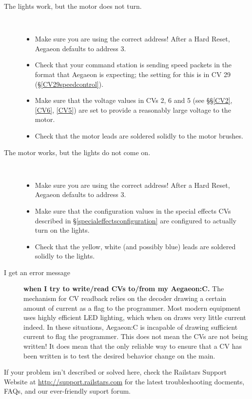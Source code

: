 \documentclass[12pt,letterpaper,draft]{memoir} %
\begin{document}
\begin{description}
\item[The lights work, but the motor does not turn.]\ 
    \begin{itemize}
	\item Make sure you are using the correct address! After a Hard Reset, Aegaeon defaults to address 3.
	\item Check that your command station is sending speed packets in the format that Aegaeon is expecting; the setting for this is in CV 29 (\S\ref{CV29speedcontrol}).
   \item Make sure that the voltage values in CVs 2, 6 and 5 (see \S\S\ref{CV2}, \ref{CV6}, \ref{CV5}) are set to provide a reasonably large voltage to the motor.
	\item Check that the motor leads are soldered solidly to the motor brushes.
	\end{itemize}

\item[The motor works, but the lights do not come on.]\ 
	\begin{itemize}
	\item Make sure you are using the correct address! After a Hard Reset, Aegaeon defaults to address 3.
   \item Make sure that the configuration values in the special effects CVs described in \S\ref{specialeffectsconfiguration} are configured to actually turn on the lights.
	\item Check that the yellow, white (and possibly blue) leads are soldered solidly to the lights.
	\end{itemize}

\item[I get an error message] \textbf{when I try to write/read CVs to/from my Aegaeon:C.} The mechanism for CV readback relies on the decoder drawing a certain amount of current as a flag to the programmer. Most modern equipment uses highly efficient LED lighting, which when on draws very little current indeed. In these situations, Aegaeon:C is incapable of drawing sufficient current to flag the programmer. This does not mean the CVs are not being written! It does mean that the only reliable way to ensure that a CV has been written is to test the desired behavior change on the main.

\end{description}

If your problem isn't described or solved here, check the Railstars Support Website at \url{http://support.railstars.com} for the latest troubleshooting docments, FAQs, and our ever-friendly suport forum.
\end{document}
